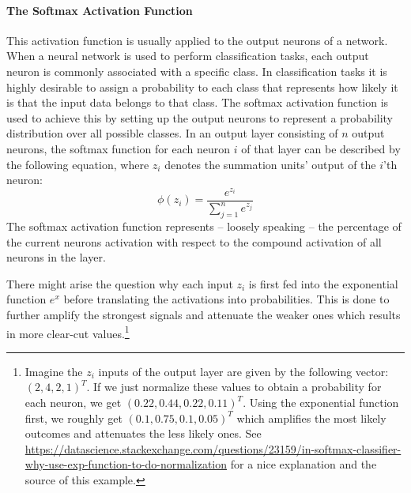 \paragraph{The Softmax Activation Function}
\label{sec:softmax}
This activation function is usually applied to the output neurons of
a network. When a neural network is used to perform classification
tasks, each output neuron is commonly associated with a specific
class. In classification tasks it is highly desirable to assign a
probability to each class that represents how likely it is that the
input data belongs to that class. The softmax activation function is
used to achieve this by setting up the output neurons to represent a
probability distribution over all possible classes.
In an output layer consisting of \(n\) output neurons, the softmax
function for each neuron \(i\) of that layer can be described by the
following equation, where \(z_i\) denotes the summation units' output of
the \(i\)'th neuron:
\begin{equation}
  \phi(z_i) = \frac{e^{z_i}}{\sum_{j=1}^{n}{e^{z_j}}}
\end{equation}
The softmax activation function represents -- loosely speaking -- the
percentage of the current neurons activation with respect to the compound
activation of all neurons in the layer.

There might arise the question why each input \(z_i\) is first fed
into the exponential function \(e^x\) before translating the
activations into probabilities. This is done to further amplify the
strongest signals and attenuate the weaker ones which results in more
clear-cut values.\footnote{Imagine the \(z_i\) inputs of the output
  layer are given by the following vector: \((2, 4, 2, 1)^T\). If we
  just normalize these values to obtain a probability for each neuron,
  we get \((0.22, 0.44, 0.22, 0.11)^T\). Using the exponential
  function first, we roughly get \((0.1, 0.75, 0.1, 0.05)^T\) which
  amplifies the most likely outcomes and attenuates the less likely
  ones. See
  \url{https://datascience.stackexchange.com/questions/23159/in-softmax-classifier-why-use-exp-function-to-do-normalization}
  for a nice explanation and the source of this example.}


